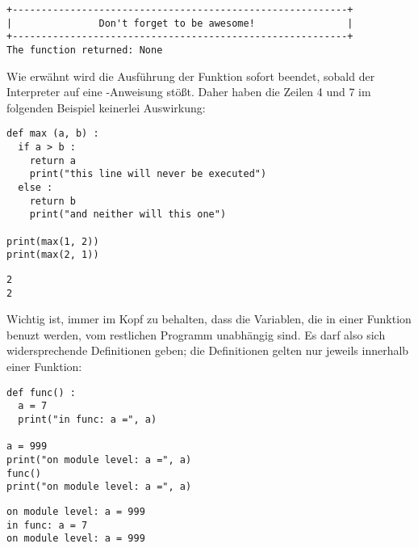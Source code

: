 \begin{cmdbox}
\begin{verbatim}
+----------------------------------------------------------+
|               Don't forget to be awesome!                |
+----------------------------------------------------------+
The function returned: None
\end{verbatim}
\end{cmdbox}

Wie erwähnt wird die Ausführung der Funktion sofort beendet, sobald der Interpreter auf eine -Anweisung stößt. Daher haben die Zeilen 4 und 7 im folgenden Beispiel keinerlei Auswirkung:
\begin{codebox}
\begin{verbatim}
def max (a, b) :
  if a > b :
    return a
    print("this line will never be executed")
  else :
    return b
    print("and neither will this one")

print(max(1, 2))
print(max(2, 1))
\end{verbatim}
\end{codebox}

\begin{cmdbox}
\begin{verbatim}
2
2
\end{verbatim}
\end{cmdbox}

Wichtig ist, immer im Kopf zu behalten, dass die Variablen, die in einer Funktion benuzt werden, vom restlichen Programm unabhängig sind. Es darf also sich widersprechende Definitionen geben; die Definitionen gelten nur jeweils innerhalb einer Funktion:

\begin{codebox}
\begin{verbatim}
def func() :
  a = 7
  print("in func: a =", a)

a = 999
print("on module level: a =", a)
func()
print("on module level: a =", a)
\end{verbatim}
\end{codebox}

\begin{cmdbox}
\begin{verbatim}
on module level: a = 999
in func: a = 7
on module level: a = 999
\end{verbatim}
\end{cmdbox}

